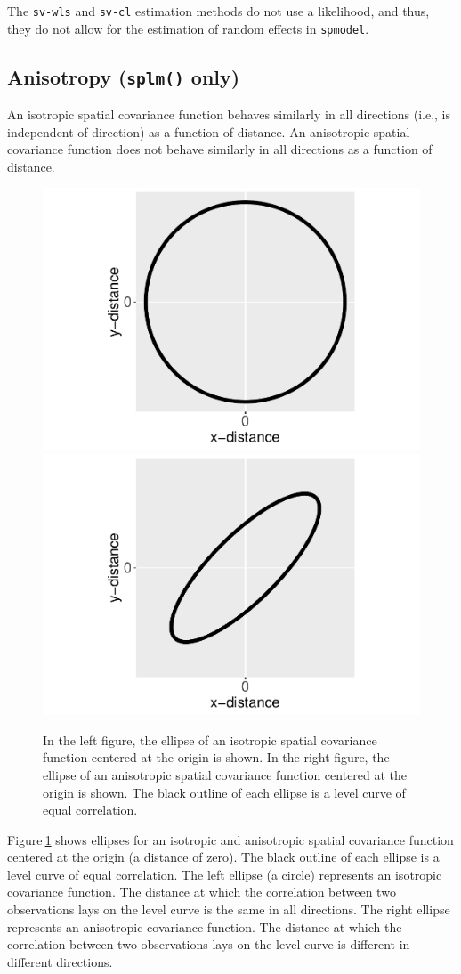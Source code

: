 \documentclass{article}
\begin{document}
The \texttt{sv-wls} and \texttt{sv-cl} estimation methods do not use a
likelihood, and thus, they do not allow for the estimation of random
effects in \texttt{spmodel}.

\hypertarget{sec:anisotropy}{%
\subsection{\texorpdfstring{Anisotropy (\texttt{splm()}
only)}{Anisotropy (splm() only)}}\label{sec:anisotropy}}

An isotropic spatial covariance function behaves similarly in all
directions (i.e., is independent of direction) as a function of
distance. An anisotropic spatial covariance function does not behave
similarly in all directions as a function of distance.

\begin{figure}
\includegraphics[width=0.5\linewidth]{supplementary_files/figure-latex/anisotropy-1} \includegraphics[width=0.5\linewidth]{supplementary_files/figure-latex/anisotropy-2} \caption{In the left figure, the ellipse of an isotropic spatial covariance function centered at the origin is shown. In the right figure, the ellipse of an anisotropic spatial covariance function centered at the origin is shown. The black outline of each ellipse is a level curve of equal correlation. }\label{fig:anisotropy}
\end{figure}

Figure\(~\)\ref{fig:anisotropy} shows ellipses for an isotropic and
anisotropic spatial covariance function centered at the origin (a
distance of zero). The black outline of each ellipse is a level curve of
equal correlation. The left ellipse (a circle) represents an isotropic
covariance function. The distance at which the correlation between two
observations lays on the level curve is the same in all directions. The
right ellipse represents an anisotropic covariance function. The
distance at which the correlation between two observations lays on the
level curve is different in different directions.
\end{document}
